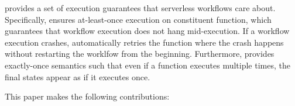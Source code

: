 


\name{} provides a set of execution guarantees that serverless workflows care
about. Specifically, \name{} ensures at-least-once execution on constituent
function, which guarantees that workflow execution does not hang
mid-execution. If a workflow execution crashes, \name{} automatically retries
the function where the crash happens without restarting the worklfow from the
beginning. Furthermore, \name{} provides exactly-once semantics such that even
if a function executes multiple times, the final states appear as if it
executes once.


This paper makes the following contributions:


